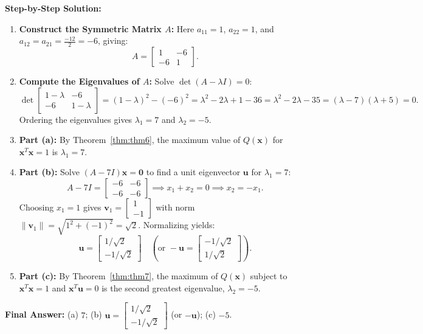 \documentclass[11pt, letterpaper]{article}
\theoremstyle{definition}
\theoremstyle{remark}
\begin{document}
\textbf{Step-by-Step Solution:}
\begin{enumerate}[leftmargin=2em]
    \item \textbf{Construct the Symmetric Matrix $A$:}
    Here $a_{11} = 1$, $a_{22} = 1$, and $a_{12} = a_{21} = \frac{-12}{2} = -6$, giving:
    \[
    A = \begin{bmatrix} 1 & -6 \\ -6 & 1 \end{bmatrix}.
    \]
    \item \textbf{Compute the Eigenvalues of $A$:}
    Solve $\det(A - \lambda I) = 0$:
    \[
    \det \begin{bmatrix} 1 - \lambda & -6 \\ -6 & 1 - \lambda \end{bmatrix} = (1 - \lambda)^2 - (-6)^2 = \lambda^2 - 2\lambda + 1 - 36 = \lambda^2 - 2\lambda - 35 = (\lambda - 7)(\lambda + 5) = 0.
    \]
    Ordering the eigenvalues gives $\lambda_1 = 7$ and $\lambda_2 = -5$.
    \item \textbf{Part (a):} By Theorem~\ref{thm:thm6}, the maximum value of $Q(\mathbf{x})$ for $\mathbf{x}^T \mathbf{x} = 1$ is $\lambda_1 = 7$.
    \item \textbf{Part (b):} Solve $(A - 7I)\mathbf{x} = \mathbf{0}$ to find a unit eigenvector $\mathbf{u}$ for $\lambda_1 = 7$:
    \[
    A - 7I = \begin{bmatrix} -6 & -6 \\ -6 & -6 \end{bmatrix} \implies x_1 + x_2 = 0 \implies x_2 = -x_1.
    \]
    Choosing $x_1 = 1$ gives $\mathbf{v}_1 = \begin{bmatrix} 1 \\ -1 \end{bmatrix}$ with norm $\|\mathbf{v}_1\| = \sqrt{1^2 + (-1)^2} = \sqrt{2}$. Normalizing yields:
    \[
    \mathbf{u} = \begin{bmatrix} 1/\sqrt{2} \\ -1/\sqrt{2} \end{bmatrix} \quad \left(\text{or } -\mathbf{u} = \begin{bmatrix} -1/\sqrt{2} \\ 1/\sqrt{2} \end{bmatrix}\right).
    \]
    \item \textbf{Part (c):} By Theorem~\ref{thm:thm7}, the maximum of $Q(\mathbf{x})$ subject to $\mathbf{x}^T \mathbf{x} = 1$ and $\mathbf{x}^T \mathbf{u} = 0$ is the second greatest eigenvalue, $\lambda_2 = -5$.
\end{enumerate}
\textbf{Final Answer:} (a) $7$; \quad (b) $\mathbf{u} = \begin{bmatrix} 1/\sqrt{2} \\ -1/\sqrt{2} \end{bmatrix}$ (or $-\mathbf{u}$); \quad (c) $-5$.
\end{document}
